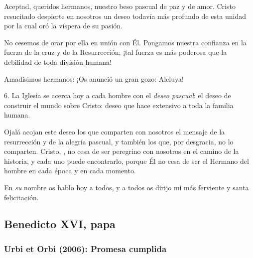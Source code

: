 \begin{body}
Aceptad, queridos hermanos, nuestro beso pascual de paz y de amor. Cristo resucitado despierte en nosotros un deseo todavía más profundo de esta unidad por la cual oró la víspera de su pasión.

No cesemos de orar por ella en unión con Él. Pongamos nuestra confianza en la fuerza de la cruz y de la Resurrección; ¡tal fuerza es más poderosa que la debilidad de toda división humana!

Amadísimos hermanos: ¡Os anunció un gran gozo: Aleluya!

6. La Iglesia se acerca hoy a cada hombre con el \textit{deseo pascual}: el deseo de construir el mundo sobre Cristo: deseo que hace extensivo a toda la familia humana.

Ojalá acojan este deseo los que comparten con nosotros el mensaje de la resurrección y de la alegría pascual, y también los que, por desgracia, no lo comparten. Cristo, , no cesa de ser peregrino con nosotros en el camino de la historia, y cada uno puede encontrarlo, porque Él no cesa de ser el Hermano del hombre en cada época y en cada momento.

En \textit{su} nombre os hablo hoy a todos, y a todos os dirijo mi más ferviente y santa felicitación.
\end{body}


\newsection
\subsection{Benedicto XVI, papa}

\subsubsection{Urbi et Orbi (2006): Promesa cumplida}

